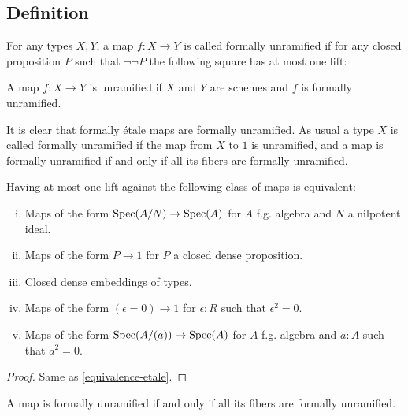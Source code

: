 \subsection{Definition}

\begin{definition}
For any types $X,Y$, a map $f:X\to Y$ is called formally unramified if for any closed proposition $P$ such that $\neg\neg P$ the following square has at most one lift:
 \begin{center}
    \end{center}
\end{definition}

\begin{definition}
A map $f:X\to Y$ is unramified if $X$ and $Y$ are schemes and $f$ is formally unramified.
\end{definition}

It is clear that formally étale maps are formally unramified. As usual a type $X$ is called formally unramified if the map from $X$ to $1$ is unramified, and a map is formally unramified if and only if all its fibers are formally unramified.

\begin{lemma}
\label{equivalence-unramified}
Having at most one lift against the following class of maps is equivalent:
\begin{enumerate}[(i)]
\item Maps of the form $\operatorname{Spec}(A/N)\to \operatorname{Spec}(A)$ for $A$ f.g. algebra and $N$ a nilpotent ideal.
\item Maps of the form $P\to 1$ for $P$ a closed dense proposition.
\item Closed dense embeddings of types.
\item Maps of the form $(\epsilon=0)\to 1$ for $\epsilon:R$ such that $\epsilon^2=0$.
\item Maps of the form $\operatorname{Spec}(A/(a)) \to \operatorname{Spec}(A)$ for $A$ f.g. algebra and $a:A$ such that $a^2=0$.
\end{enumerate}
\end{lemma}

\begin{proof}
Same as \cref{equivalence-etale}.
\end{proof}

\begin{lemma}
A map is formally unramified if and only if all its fibers are formally unramified.
\end{lemma}

